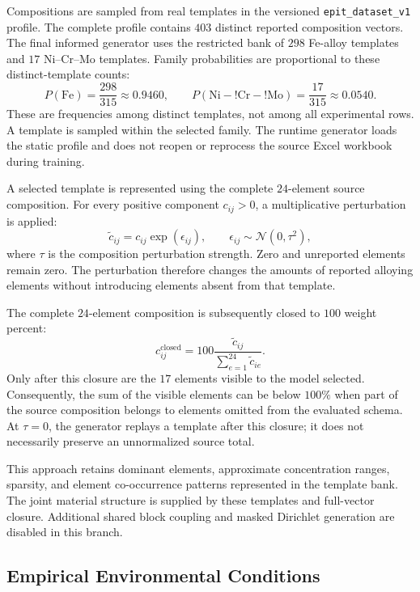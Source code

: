 \documentclass{article}
\begin{document}
Compositions are sampled from real templates in the versioned
\texttt{epit\_dataset\_v1} profile. The complete profile contains \(403\)
distinct reported composition vectors. The final informed generator uses the
restricted bank of \(298\) Fe-alloy templates and \(17\) Ni--Cr--Mo templates.
Family probabilities are proportional to these distinct-template counts:
\[
P(\mathrm{Fe})=\frac{298}{315}\approx0.9460,
\qquad
P(\mathrm{Ni\!-!Cr\!-!Mo})=\frac{17}{315}\approx0.0540.
\]
These are frequencies among distinct templates, not among all experimental
rows. A template is sampled within the selected family. The runtime generator
loads the static profile and does not reopen or reprocess the source Excel
workbook during training.

A selected template is represented using the complete \(24\)-element source
composition. For every positive component \(c_{ij}>0\), a multiplicative
perturbation is applied:
\begin{equation}
\widetilde c_{ij}=c_{ij}\exp(\epsilon_{ij}),
\qquad \epsilon_{ij}\sim\mathcal{N}(0,\tau^2),
\label{eq:composition-perturbation}
\end{equation}
where \(\tau\) is the composition perturbation strength. Zero and unreported
elements remain zero. The perturbation therefore changes the amounts of
reported alloying elements without introducing elements absent from that
template.

The complete \(24\)-element composition is subsequently closed to \(100\)
weight percent:
\begin{equation}
c_{ij}^{\mathrm{closed}}
=100\frac{\widetilde c_{ij}}{\sum_{e=1}^{24}\widetilde c_{ie}}.
\label{eq:composition-closure}
\end{equation}
Only after this closure are the \(17\) elements visible to the model selected.
Consequently, the sum of the visible elements can be below \(100\%\) when
part of the source composition belongs to elements omitted from the evaluated
schema. At \(\tau=0\), the generator replays a template after this closure;
it does not necessarily preserve an unnormalized source total.

This approach retains dominant elements, approximate concentration ranges,
sparsity, and element co-occurrence patterns represented in the template bank.
The joint material structure is supplied by these templates and full-vector
closure. Additional shared block coupling and masked Dirichlet generation are
disabled in this branch.

\subsection{Empirical Environmental Conditions}
\end{document}
